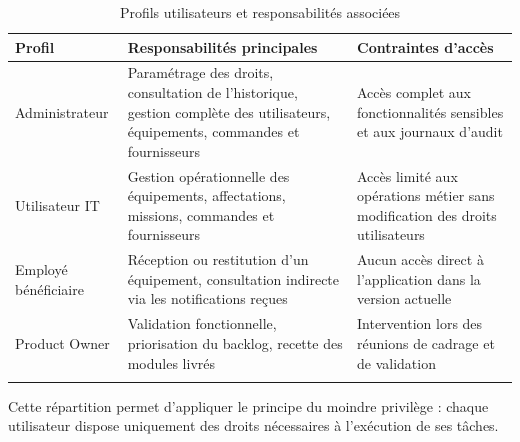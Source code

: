 \begin{longtable}{|m{3.5cm}|m{5cm}|m{5cm}|}
\hline
\textbf{Profil} & \textbf{Responsabilités principales} & \textbf{Contraintes d'accès} \\
\hline
\endhead
\endfoot
\endlastfoot
\hline
Administrateur & Paramétrage des droits, consultation de l'historique, gestion complète des utilisateurs, équipements, commandes et fournisseurs & Accès complet aux fonctionnalités sensibles et aux journaux d'audit \\
\hline
Utilisateur IT & Gestion opérationnelle des équipements, affectations, missions, commandes et fournisseurs & Accès limité aux opérations métier sans modification des droits utilisateurs \\
\hline
Employé bénéficiaire & Réception ou restitution d'un équipement, consultation indirecte via les notifications reçues & Aucun accès direct à l'application dans la version actuelle \\
\hline
Product Owner & Validation fonctionnelle, priorisation du backlog, recette des modules livrés & Intervention lors des réunions de cadrage et de validation \\
\hline
\captionsetup{justification=centering,margin=1cm}
\caption{Profils utilisateurs et responsabilités associées}
\end{longtable}

Cette répartition permet d'appliquer le principe du moindre privilège : chaque utilisateur dispose uniquement des droits nécessaires à l'exécution de ses tâches.

